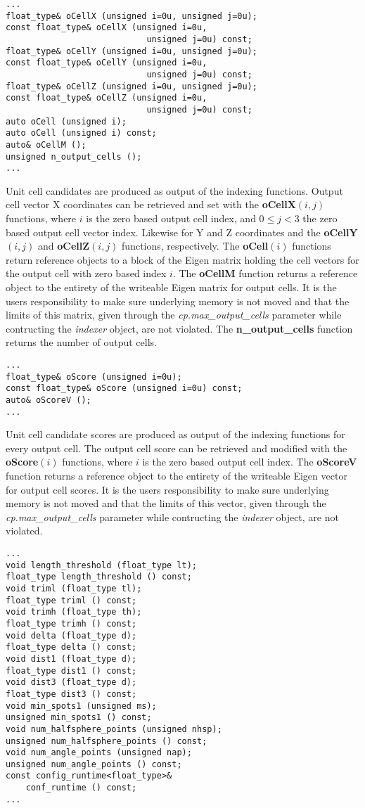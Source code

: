 \documentclass[a4paper,10pt]{article}
\begin{document}
%
\begin{lstlisting}
...
float_type& oCellX (unsigned i=0u, unsigned j=0u);
const float_type& oCellX (unsigned i=0u,
                            unsigned j=0u) const;
float_type& oCellY (unsigned i=0u, unsigned j=0u);
const float_type& oCellY (unsigned i=0u,
                            unsigned j=0u) const;
float_type& oCellZ (unsigned i=0u, unsigned j=0u);
const float_type& oCellZ (unsigned i=0u,
                            unsigned j=0u) const;
auto oCell (unsigned i);
auto oCell (unsigned i) const;
auto& oCellM ();
unsigned n_output_cells ();
...
\end{lstlisting}
%
Unit cell candidates are produced as output of the indexing functions. Output cell vector X coordinates can be retrieved and set with the \textbf{oCellX}$(i,j)$ functions, where $i$ is the zero based output cell index, and $0\leq j<3$ the zero based output cell vector index. Likewise for Y and Z coordinates and the \textbf{oCellY}$(i,j)$ and \textbf{oCellZ}$(i,j)$ functions, respectively. The \textbf{oCell}$(i)$ functions return reference objects to a block of the Eigen matrix holding the cell vectors for the output cell with zero based index $i$. The \textbf{oCellM} function returns a reference object to the entirety of the writeable Eigen matrix for output cells. It is the users responsibility to make sure underlying memory is not moved and that the limits of this matrix, given through the \emph{cp.max\_output\_cells} parameter while contructing the \emph{indexer} object, are not violated. The \textbf{n\_output\_cells} function returns the number of output cells.
%
\begin{lstlisting}
...
float_type& oScore (unsigned i=0u);
const float_type& oScore (unsigned i=0u) const;
auto& oScoreV ();
...
\end{lstlisting}
%
Unit cell candidate scores are produced as output of the indexing functions for every output cell. The output cell score can be retrieved and modified with the \textbf{oScore}$(i)$ functions, where $i$ is the zero based output cell index. The \textbf{oScoreV} function returns a reference object to the entirety of the writeable Eigen vector for output cell scores. It is the users responsibility to make sure underlying memory is not moved and that the limits of this vector, given through the \emph{cp.max\_output\_cells} parameter while contructing the \emph{indexer} object, are not violated.
%
\begin{lstlisting}
...
void length_threshold (float_type lt);
float_type length_threshold () const;
void triml (float_type tl);
float_type triml () const;
void trimh (float_type th);
float_type trimh () const;
void delta (float_type d);
float_type delta () const;
void dist1 (float_type d);
float_type dist1 () const;
void dist3 (float_type d);
float_type dist3 () const;
void min_spots1 (unsigned ms);
unsigned min_spots1 () const;
void num_halfsphere_points (unsigned nhsp);
unsigned num_halfsphere_points () const;
void num_angle_points (unsigned nap);
unsigned num_angle_points () const;
const config_runtime<float_type>&
    conf_runtime () const;
...
\end{lstlisting}
\end{document}
